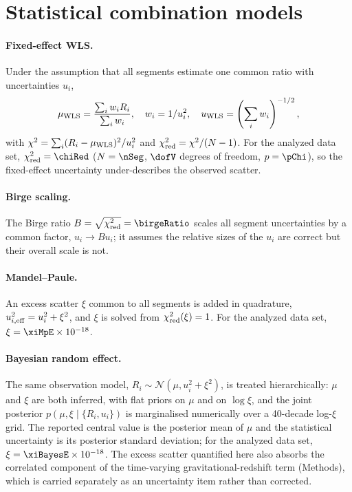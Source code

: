 \begin{table}[t]
  \centering
  \caption{Per-segment data of the 16 segments analyzed in this work. Ratio
  deviations $y_i = R_i/R_1 - 1$ are relative to the first segment;
  $u(y_i)$ is the statistical uncertainty of the segment ratio;
  ``Fit'' is \emph{est.} for segments whose stability fit lies in the
  white-frequency-noise band and \emph{lim.} for model-limited fits.}
  \label{tab:segments}
  
\end{table}

\section{Statistical combination models}
\label{app:stats}

\paragraph{Fixed-effect WLS.} Under the assumption that all segments
estimate one common ratio with uncertainties $u_i$,
\[
  \mu_{\rm WLS} = \frac{\sum_i w_i R_i}{\sum_i w_i}, \quad
  w_i = 1/u_i^2, \quad
  u_{\rm WLS} = \left(\sum_i w_i\right)^{-1/2},
\]
with $\chi^2 = \sum_i (R_i - \mu_{\rm WLS})^2 / u_i^2$ and
$\chi^2_{\rm red} = \chi^2/(N-1)$. For the analyzed data set,
$\chi^2_{\rm red} = \chiRed$ ($N = \nSeg$,
$\dofV$ degrees of freedom, $p = \pChi$), so the fixed-effect
uncertainty under-describes the observed scatter.

\paragraph{Birge scaling.} The Birge ratio
$B = \sqrt{\chi^2_{\rm red}} = \birgeRatio$ scales all segment
uncertainties by a common factor, $u_i \to B u_i$; it assumes the
relative sizes of the $u_i$ are correct but their overall scale is
not.

\paragraph{Mandel--Paule.} An excess scatter $\xi$ common to all
segments is added in quadrature, $u_{i,\rm eff}^2 = u_i^2 + \xi^2$,
and $\xi$ is solved from $\chi^2_{\rm red}(\xi) = 1$. For the analyzed
data set, $\xi = \xiMpE \times 10^{-18}$.

\paragraph{Bayesian random effect.} The same observation model,
$R_i \sim \mathcal{N}(\mu, u_i^2 + \xi^2)$, is treated
hierarchically: $\mu$ and $\xi$ are both inferred, with flat priors
on $\mu$ and on $\log\xi$, and the joint posterior
$p(\mu, \xi \mid \{R_i, u_i\})$ is marginalised numerically over a
40-decade log-$\xi$ grid. The reported central value is the posterior
mean of $\mu$ and the statistical uncertainty is its posterior
standard deviation; for the analyzed data set,
$\xi = \xiBayesE \times 10^{-18}$. The excess scatter quantified here
also absorbs the correlated component of the time-varying
gravitational-redshift term (Methods), which
is carried separately as an uncertainty item rather than corrected.

